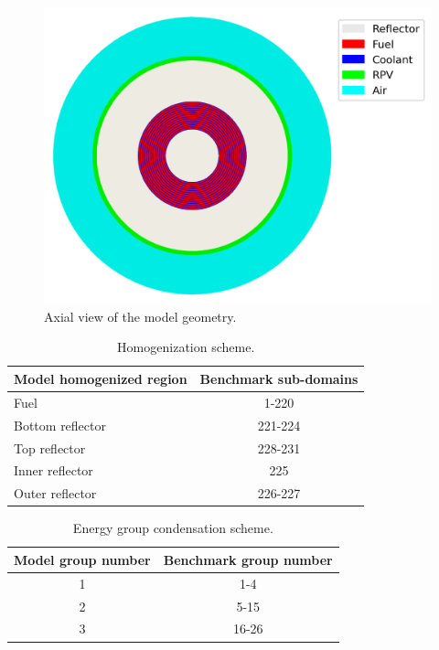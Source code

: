 \begin{figure}[htbp!]
  \centering
  \includegraphics[width=0.45\linewidth]{figures-thermal/ex3-mesh}
  \hfill
  \caption{Axial view of the model geometry.}
  \label{fig:coupled-mesh}
\end{figure}

\begin{table}[htbp!]
\centering
      \caption{Homogenization scheme.}
      \label{tab:coupled-rz}
    \begin{tabular}{l c}
  \toprule
  Model homogenized region & Benchmark sub-domains \\
  \midrule
  Fuel               & 1-220   \\
  Bottom reflector   & 221-224 \\
  Top reflector      & 228-231 \\
  Inner reflector    & 225     \\
  Outer reflector    & 226-227 \\
  \bottomrule
  \end{tabular}
\end{table}

\begin{table}[htbp!]
\centering
      \caption{Energy group condensation scheme.}
      \label{tab:coupled-eg}
    \begin{tabular}{c c}
  \toprule
  Model group number & Benchmark group number \\
  \midrule
  1 & 1-4   \\
  2 & 5-15  \\
  3 & 16-26 \\
  \bottomrule
  \end{tabular}
\end{table}

